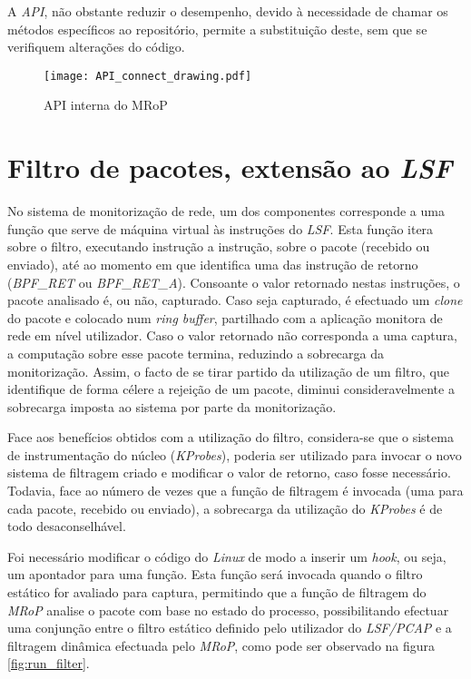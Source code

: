 A \textit{API}, não obstante reduzir o desempenho, devido à necessidade de chamar os métodos específicos ao repositório, permite a substituição deste, sem que se verifiquem alterações do código.

\begin{figure}[!htbp]
\centering
\texttt{[image: API\_connect\_drawing.pdf]}
\caption{API interna do MRoP}
\label{fig:api_connect}
\end{figure}

\section{Filtro de pacotes, extensão ao \textit{LSF}}

No sistema de monitorização de rede, um dos componentes corresponde a uma função que serve de máquina virtual às instruções do \textit{LSF}.
Esta função itera sobre o filtro, executando instrução a instrução, sobre o pacote (recebido ou enviado), até ao momento em que identifica uma das instrução de retorno (\textit{BPF\_RET} ou \textit{BPF\_RET\_A}).
Consoante o valor retornado nestas instruções, o pacote analisado é, ou não, capturado.
Caso seja capturado, é efectuado um \textit{clone} do pacote e colocado num \textit{ring buffer}, partilhado com a aplicação monitora de rede em nível utilizador.
Caso o valor retornado não corresponda a uma captura, a computação sobre esse pacote termina, reduzindo a sobrecarga da monitorização.
Assim, o facto de se tirar partido da utilização de um filtro, que identifique de forma célere a rejeição de um pacote, diminui consideravelmente a sobrecarga imposta ao sistema por parte da monitorização.

Face aos benefícios obtidos com a utilização do filtro, considera-se que o sistema de instrumentação do núcleo (\textit{KProbes}), poderia ser utilizado para invocar o novo sistema de filtragem criado e modificar o valor de retorno, caso fosse necessário.
Todavia, face ao número de vezes que a função de filtragem é invocada (uma para cada pacote, recebido ou enviado), a sobrecarga da utilização do \textit{KProbes} é de todo desaconselhável.

Foi necessário modificar o código do \textit{Linux} de modo a inserir um \textit{hook}, ou seja, um apontador para uma função.
Esta função será invocada quando o filtro estático for avaliado para captura, permitindo que a função de filtragem do \textit{MRoP} analise o pacote com base no estado do processo, possibilitando efectuar uma conjunção entre o filtro estático definido pelo utilizador do \textit{LSF/PCAP} e a filtragem dinâmica efectuada pelo \textit{MRoP}, como pode ser observado na figura \ref{fig:run_filter}.

